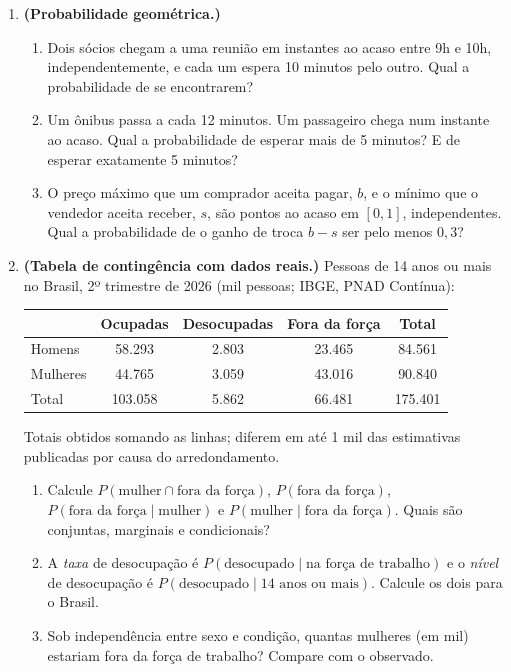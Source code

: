 \documentclass[11pt]{article}
\begin{document}
\begin{enumerate}[label=\textbf{A\arabic*.}, leftmargin=*]

\item \textbf{(Probabilidade geométrica.)}
\begin{enumerate}[label=(\alph*)]
  \item Dois sócios chegam a uma reunião em instantes ao acaso entre 9h e 10h, independentemente, e cada um espera 10
    minutos pelo outro. Qual a probabilidade de se encontrarem?
  \item Um ônibus passa a cada 12 minutos. Um passageiro chega num instante ao acaso. Qual a probabilidade de esperar
    mais de 5 minutos? E de esperar exatamente 5 minutos?
  \item O preço máximo que um comprador aceita pagar, $b$, e o mínimo que o vendedor aceita receber, $s$, são pontos ao
    acaso em $[0, 1]$, independentes. Qual a probabilidade de o ganho de troca $b - s$ ser pelo menos $0{,}3$?
\end{enumerate}

\item \textbf{(Tabela de contingência com dados reais.)} Pessoas de 14 anos ou mais no Brasil, 2º trimestre de 2026 (mil pessoas;
IBGE, PNAD Contínua):
\begin{center}
\begin{tabular}{l|ccc|c}
\toprule
 & Ocupadas & Desocupadas & Fora da força & Total \\
\midrule
Homens & 58.293 & 2.803 & 23.465 & 84.561 \\
Mulheres & 44.765 & 3.059 & 43.016 & 90.840 \\
\midrule
Total & 103.058 & 5.862 & 66.481 & 175.401 \\
\bottomrule
\end{tabular}
\end{center}
{\footnotesize Totais obtidos somando as linhas; diferem em até 1 mil das estimativas publicadas por causa do arredondamento.}

\begin{enumerate}[label=(\alph*)]
  \item Calcule $P(\text{mulher} \cap \text{fora da força})$, $P(\text{fora da força})$, $P(\text{fora da força} \mid \text{mulher})$ e
    $P(\text{mulher} \mid \text{fora da força})$. Quais são conjuntas, marginais e condicionais?
  \item A \emph{taxa} de desocupação é $P(\text{desocupado} \mid \text{na força de trabalho})$ e o \emph{nível} de desocupação é
    $P(\text{desocupado} \mid \text{14 anos ou mais})$. Calcule os dois para o Brasil.
  \item Sob independência entre sexo e condição, quantas mulheres (em mil) estariam fora da força de trabalho? Compare com o observado.
\end{enumerate}


\end{enumerate}
\end{document}

